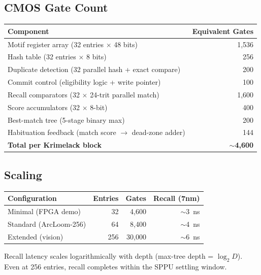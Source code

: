 \documentclass[11pt, a4paper]{article}
\begin{document}
\subsection{CMOS Gate Count}

\begin{center}
\begin{tabular}{@{}lr@{}}
\toprule
\textbf{Component} & \textbf{Equivalent Gates} \\
\midrule
Motif register array (32 entries $\times$ 48 bits) & 1,536 \\
Hash table (32 entries $\times$ 8 bits) & 256 \\
Duplicate detection (32 parallel hash + exact compare) & 200 \\
Commit control (eligibility logic + write pointer) & 100 \\
Recall comparators (32 $\times$ 24-trit parallel match) & 1,600 \\
Score accumulators (32 $\times$ 8-bit) & 400 \\
Best-match tree (5-stage binary max) & 200 \\
Habituation feedback (match score $\to$ dead-zone adder) & 144 \\
\midrule
\textbf{Total per Krimelack block} & \textbf{$\sim$4,600} \\
\bottomrule
\end{tabular}
\end{center}

\subsection{Scaling}

\begin{center}
\begin{tabular}{@{}lrrr@{}}
\toprule
\textbf{Configuration} & \textbf{Entries} & \textbf{Gates} &
\textbf{Recall (7nm)} \\
\midrule
Minimal (FPGA demo) & 32 & 4,600 & $\sim$3~ns \\
Standard (ArcLoom-256) & 64 & 8,400 & $\sim$4~ns \\
Extended (vision) & 256 & 30,000 & $\sim$6~ns \\
\bottomrule
\end{tabular}
\end{center}

Recall latency scales logarithmically with depth (max-tree
depth = $\log_2 D$). Even at 256 entries, recall completes
within the SPPU settling window.
\end{document}
